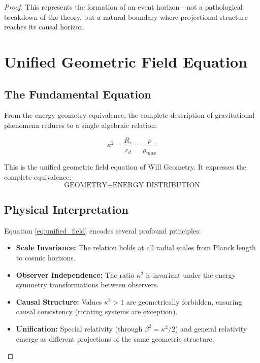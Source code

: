 \documentclass{article}
\begin{document}
\begin{proof}
This represents the formation of an event horizon—not a pathological breakdown of the theory, but a natural  boundary where projectional structure reaches its causal horizon.

\section{Unified Geometric Field Equation}

\subsection{The Fundamental Equation}
From the energy-geometry equivalence, the complete description of gravitational phenomena reduces to a single algebraic relation:

\begin{equation}
\boxed{
\kappa^2 = \frac{R_s}{r_{d}} = \frac{\rho}{\rho_{max}}
}
\label{eq:unified_field}
\end{equation}

This is the unified geometric field equation of Will Geometry. It expresses the complete equivalence:
\[
\text{GEOMETRY} \equiv \text{ENERGY DISTRIBUTION}
\]

\subsection*{Physical Interpretation}

Equation \eqref{eq:unified_field} encodes several profound principles:

\begin{itemize}
\item \textbf{Scale Invariance:} The relation holds at all radial scales from Planck length to cosmic horizons.

\item \textbf{Observer Independence:} The ratio $\kappa^2$ is invariant under the energy symmetry transformations between observers.

\item \textbf{Causal Structure:} Values $\kappa^2 > 1$ are geometrically forbidden, ensuring causal consistency (rotating systems are exception).

\item \textbf{Unification:} Special relativity (through $\beta^2 = \kappa^2/2$) and general relativity emerge as different projections of the same geometric structure.
\end{itemize}



\end{proof}
\end{document}
